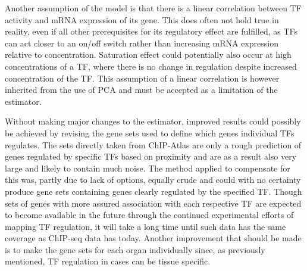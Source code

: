 Another assumption of the model is that there is a linear correlation between \ac{TF} activity and mRNA expression of its gene. This does often not hold true in reality, even if all other prerequisites for its regulatory effect are fulfilled, as \acp{TF} can act closer to an on/off switch rather than increasing mRNA expression relative to concentration. Saturation effect could potentially also occur at high concentrations of a \ac{TF}, where there is no change in regulation despite increased concentration of the \ac{TF}. This assumption of a linear correlation is however inherited from the use of \ac{PCA} and must be accepted as a limitation of the estimator.

Without making major changes to the estimator, improved results could possibly be achieved by revising the gene sets used to define which genes individual \acp{TF} regulates. The sets directly taken from ChIP-Atlas are only a rough prediction of genes regulated by specific \acp{TF} based on proximity and are as a result also very large and likely to contain much noise. The method applied to compensate for this was, partly due to lack of options, equally crude and could with no certainty produce gene sets containing genes clearly regulated by the specified \ac{TF}. Though sets of genes with more assured association with each respective \ac{TF} are expected to become available in the future through the continued experimental efforts of mapping \ac{TF} regulation, it will take a long time until such data has the same coverage as ChIP-seq data has today. Another improvement that should be made is to make the gene sets for each organ individually since, as previously mentioned, \ac{TF} regulation in cases can be tissue specific.
